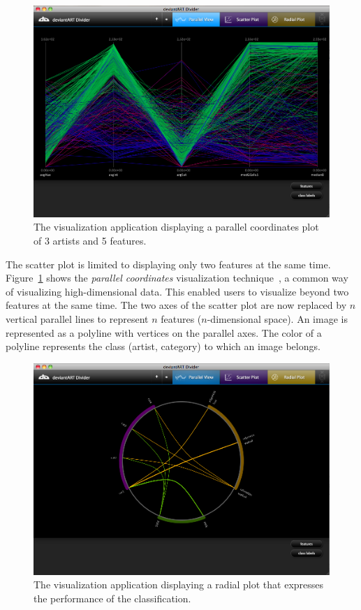 \begin{figure}[htb]
  \centering
  \includegraphics[width=1\linewidth]{img/visualization_parallel.png}
  \caption{The visualization application displaying a parallel coordinates plot of 3 artists and 5 features.}
  \label{fig:visualization_parallel}
\end{figure}

The scatter plot is limited to displaying only two features at the same time.
Figure~\ref{fig:visualization_parallel} shows the \textit{parallel coordinates} visualization technique~\cite{andrienko2001constructing}, a common way of visualizing high-dimensional data.
This enabled users to visualize beyond two features at the same time.
The two axes of the scatter plot are now replaced by $n$ vertical parallel lines to represent $n$ features ($n$-dimensional space).
An image is represented as a polyline with vertices on the parallel axes.
The color of a polyline represents the class (artist, category) to which an image belongs.

\begin{figure}[htb]
  \centering
  \includegraphics[width=1\linewidth]{img/visualization_radial.png}
  \caption{The visualization application displaying a radial plot that expresses the performance of the classification.}
  \label{fig:visualization_radial}
\end{figure}

